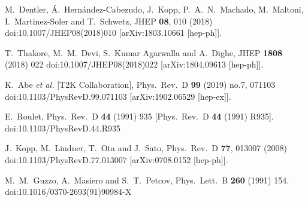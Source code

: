 \begin{thebibliography}{00}
M.~Dentler, \'A.~Hern\'andez-Cabezudo, J.~Kopp, P.~A.~N.~Machado, M.~Maltoni, I.~Martinez-Soler and T.~Schwetz,
JHEP \textbf{08}, 010 (2018)
doi:10.1007/JHEP08(2018)010
[arXiv:1803.10661 [hep-ph]].

  T.~Thakore, M.~M.~Devi, S.~Kumar Agarwalla and A.~Dighe,
  JHEP {\bf 1808} (2018) 022
  doi:10.1007/JHEP08(2018)022
  [arXiv:1804.09613 [hep-ph]].
  
  K.~Abe {\it et al.} [T2K Collaboration],
  Phys.\ Rev.\ D {\bf 99} (2019) no.7,  071103
  doi:10.1103/PhysRevD.99.071103
  [arXiv:1902.06529 [hep-ex]].
  
  
  E.~Roulet,
  Phys.\ Rev.\ D {\bf 44} (1991) 935
   [Phys.\ Rev.\ D {\bf 44} (1991) R935].
  doi:10.1103/PhysRevD.44.R935
  
  J.~Kopp, M.~Lindner, T.~Ota and J.~Sato,
  Phys.\ Rev.\ D {\bf 77}, 013007 (2008)
  doi:10.1103/PhysRevD.77.013007
  [arXiv:0708.0152 [hep-ph]].
  
  M.~M.~Guzzo, A.~Masiero and S.~T.~Petcov,
  Phys.\ Lett.\ B {\bf 260} (1991) 154.
  doi:10.1016/0370-2693(91)90984-X
  



\end{thebibliography}
